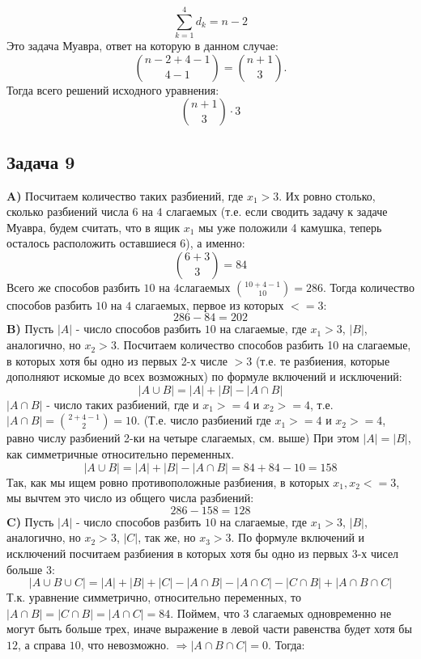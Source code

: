 \documentclass{article}
\begin{document}
   $$ \sum_{k=1}^{4}d_k = n - 2$$
  Это задача Муавра, ответ на которую в данном случае: $${n - 2 + 4 - 1 \choose 4 - 1} = {n + 1 \choose 3}.$$ 
  Тогда всего решений исходного уравнения:
	  $$ {n + 1 \choose 3} \cdot 3$$
 
 \begin{center}
 	\subsection*{Задача 9}
 \end{center}
 \textbf{A)} Посчитаем количество таких разбиений, где $x_1 > 3$. Их ровно столько, сколько разбиений числа $6$ на $4$ слагаемых (т.е. если сводить задачу к задаче Муавра, будем считать, что в ящик $x_1$ мы уже положили 4 камушка, теперь осталось расположить оставшиеся 6), а именно:
 $$ {6 + 3 \choose 3} = 84 $$
 Всего же способов разбить $10$ на $ 4 $слагаемых $ {10 + 4 - 1 \choose 10} = 286 $.
 Тогда количество способов разбить $10$ на $ 4$ слагаемых, первое из которых $<= 3$:
 $$ 286 - 84 = 202 $$
 \textbf{B)} Пусть $ |A| $ - число способов разбить $10$ на слагаемые, где $ x_1 > 3 $, $ |B| $, аналогично, но $ x_2 > 3 $. Посчитаем количество способов разбить 10 на слагаемые, в которых хотя бы одно из первых 2-х числе $>3$ (т.е. те разбиения, которые дополняют искомые до всех возможных) по формуле включений и исключений:
 $$ |A \cup B| = |A| + |B| - |A \cap B|$$
 $|A \cap B|$ - число таких разбиений, где и $x_1 >= 4$ и $x_2 >= 4$, т.е. $ |A \cap B| = {2 + 4 - 1 \choose 2} = 10$. (Т.е. число разбиений где $x_1 >= 4$ и $x_2 >= 4$, равно числу разбиений 2-ки на четыре слагаемых, см. выше)
 При этом $ |A| = |B|  $, как симметричные относительно переменных.
  $$ |A \cup B| = |A| + |B| - |A \cap B| = 84 + 84 - 10 = 158$$
 Так, как мы ищем ровно противоположные разбиения, в которых $ x_1, x_2 <= 3$, мы вычтем это число из общего числа разбиений:
 $$ 286 - 158 = 128 $$
 \textbf{C)} Пусть $ |A| $ - число способов разбить $10$ на слагаемые, где $ x_1 > 3 $, $ |B| $, аналогично, но $ x_2 > 3 $, $ |C| $, так же, но $ x_3 > 3 $. По формуле включений и исключений посчитаем разбиения в которых хотя бы одно из первых 3-х чисел больше 3:
 $$ |A \cup B \cup C| = |A| + |B| + |C| - |A \cap B| -  |A \cap C| -  |C \cap B| +  |A \cap B \cap C|$$
 Т.к. уравнение симметрично, относительно переменных, то $|A \cap B| = |C \cap B| = |A \cap C| = 84$. Поймем, что $3$ слагаемых одновременно не могут быть больше трех, иначе выражение в левой части равенства будет хотя бы $12$, а справа $10$, что невозможно. $ \Rightarrow |A \cap B \cap C| = 0$. Тогда:
\end{document}
